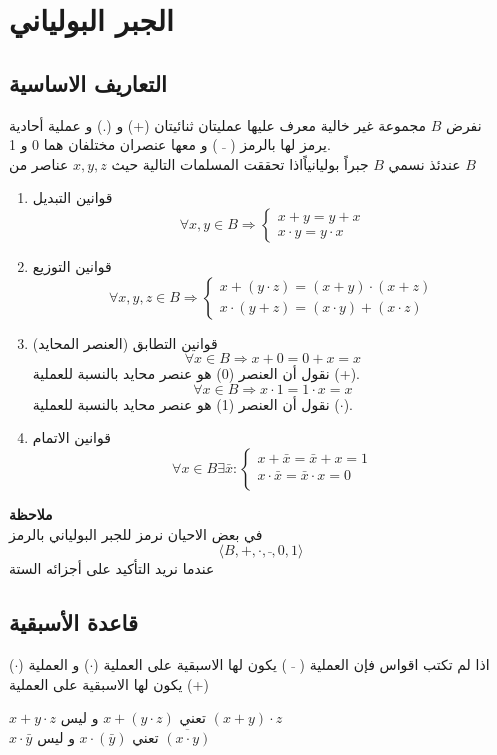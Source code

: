 \chapter{الجبر البولياني}

\section{التعاريف الاساسية}
نفرض $B$ مجموعة غير خالية معرف عليها عمليتان ثنائيتان (+) و (.) و عملية أحادية يرمز لها بالرمز ( $\bar{}$ ) و معها عنصران مختلفان هما 0 و 1.\\
عندئذ نسمي $B$ جبراً بوليانياًاذا تحققت المسلمات التالية حيث $x,y,z$ عناصر من $B$
\begin{enumerate}
	\item قوانين التبديل
	\[
	\forall x, y \in B \Rightarrow \begin{cases}
		x + y = y + x\\
		x\cdot y = y \cdot x
	\end{cases}
	\]
	\item قوانين التوزيع
	\[
	\forall x,y,z \in B \Rightarrow \begin{cases}
		x + (y\cdot z) = (x+y)\cdot(x+z) \\
		x \cdot(y+z) = (x\cdot y) + (x\cdot z)
	\end{cases}
	\]
	\item قوانين التطابق (العنصر المحايد)
	\[
	\forall x \in B \Rightarrow x + 0 = 0 + x = x
	\]
	نقول أن العنصر (0) هو عنصر محايد بالنسبة للعملية (+).
	\[
	\forall x \in B \Rightarrow x \cdot 1= 1\cdot  x = x
	\]
	نقول أن العنصر (1) هو عنصر محايد بالنسبة للعملية ($\cdot$).
	\item قوانين الاتمام 
	\[
	\forall x \in B \exists \bar{x}: \begin{cases}
		x + \bar{x} = \bar{x} + x = 1\\
		x \cdot\bar{x} = \bar{x} \cdot x = 0\\
	\end{cases}
	\]
\end{enumerate}
\noindent
\textbf{ملاحظة}\\
\noindent
في بعض الاحيان نرمز للجبر البولياني بالرمز
\[
\langle B, +, \cdot, \bar{}, 0, 1\rangle
\]
عندما نريد التأكيد على أجزائه الستة
\section*{قاعدة الأسبقية}
اذا لم تكتب اقواس فإن العملية ( $\bar{}$ ) يكون لها الاسبقية على العملية ($\cdot$) و العملية ($\cdot$) يكون لها الاسبقية على العملية (+)
\begin{example}
	$x+y\cdot z$ تعني $x+(y\cdot z)$ و ليس $(x+y)\cdot z$\\
	$x \cdot \bar{y}$ تعني $x\cdot (\bar{y})$ و ليس  $\overline{(x\cdot y)}$
\end{example}
